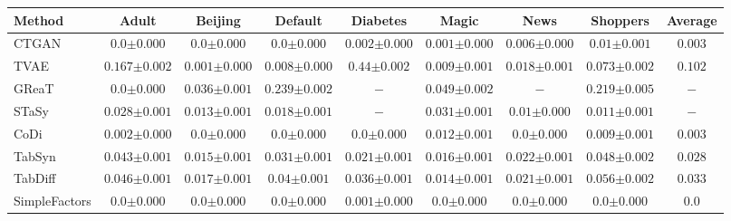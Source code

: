 \begin{tabular}{lccccccc|c}
    \toprule[0.8pt]
     \textbf{Method} & \textbf{Adult} & \textbf{Beijing} & \textbf{Default} & \textbf{Diabetes} & \textbf{Magic} & \textbf{News} & \textbf{Shoppers} & \textbf{Average} \\
    \midrule 
    CTGAN & $0.0${\tiny${\pm 0.000}$} & $0.0${\tiny${\pm 0.000}$} & $0.0${\tiny${\pm 0.000}$} & $0.002${\tiny${\pm 0.000}$} & $0.001${\tiny${\pm 0.000}$} & $0.006${\tiny${\pm 0.000}$} & $0.01${\tiny${\pm 0.001}$} & $0.003$ \\
    TVAE & $0.167${\tiny${\pm 0.002}$} & $0.001${\tiny${\pm 0.000}$} & $0.008${\tiny${\pm 0.000}$} & $0.44${\tiny${\pm 0.002}$} & $0.009${\tiny${\pm 0.001}$} & $0.018${\tiny${\pm 0.001}$} & $0.073${\tiny${\pm 0.002}$} & $0.102$ \\
    GReaT & $0.0${\tiny${\pm 0.000}$} & $0.036${\tiny${\pm 0.001}$} & $0.239${\tiny${\pm 0.002}$} & $-$ & $0.049${\tiny${\pm 0.002}$} & $-$ & $0.219${\tiny${\pm 0.005}$} & $-$ \\
    STaSy & $0.028${\tiny${\pm 0.001}$} & $0.013${\tiny${\pm 0.001}$} & $0.018${\tiny${\pm 0.001}$} & $-$ & $0.031${\tiny${\pm 0.001}$} & $0.01${\tiny${\pm 0.000}$} & $0.011${\tiny${\pm 0.001}$} & $-$ \\
    CoDi & $0.002${\tiny${\pm 0.000}$} & $0.0${\tiny${\pm 0.000}$} & $0.0${\tiny${\pm 0.000}$} & $0.0${\tiny${\pm 0.000}$} & $0.012${\tiny${\pm 0.001}$} & $0.0${\tiny${\pm 0.000}$} & $0.009${\tiny${\pm 0.001}$} & $0.003$ \\
    TabSyn & $0.043${\tiny${\pm 0.001}$} & $0.015${\tiny${\pm 0.001}$} & $0.031${\tiny${\pm 0.001}$} & $0.021${\tiny${\pm 0.001}$} & $0.016${\tiny${\pm 0.001}$} & $0.022${\tiny${\pm 0.001}$} & $0.048${\tiny${\pm 0.002}$} & $0.028$ \\
    TabDiff & $0.046${\tiny${\pm 0.001}$} & $0.017${\tiny${\pm 0.001}$} & $0.04${\tiny${\pm 0.001}$} & $0.036${\tiny${\pm 0.001}$} & $0.014${\tiny${\pm 0.001}$} & $0.021${\tiny${\pm 0.001}$} & $0.056${\tiny${\pm 0.002}$} & $0.033$ \\
    \midrule
    SimpleFactors & $0.0${\tiny${\pm 0.000}$} & $0.0${\tiny${\pm 0.000}$} & $0.0${\tiny${\pm 0.000}$} & $0.001${\tiny${\pm 0.000}$} & $0.0${\tiny${\pm 0.000}$} & $0.0${\tiny${\pm 0.000}$} & $0.0${\tiny${\pm 0.000}$} & $0.0$ \\

\end{tabular}
